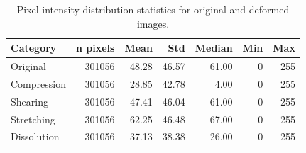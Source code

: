 \begin{table}[htbp]
\caption{Pixel intensity distribution statistics for original and deformed images.}
\label{tab:intensity_distributions}
\begin{tabular}{lrrrrrr}
\toprule
Category & n pixels & Mean & Std & Median & Min & Max \\
\midrule
Original & 301056 & 48.28 & 46.57 & 61.00 & 0 & 255 \\
Compression & 301056 & 28.85 & 42.78 & 4.00 & 0 & 255 \\
Shearing & 301056 & 47.41 & 46.04 & 61.00 & 0 & 255 \\
Stretching & 301056 & 62.25 & 46.48 & 67.00 & 0 & 255 \\
Dissolution & 301056 & 37.13 & 38.38 & 26.00 & 0 & 255 \\
\bottomrule
\end{tabular}
\end{table}
